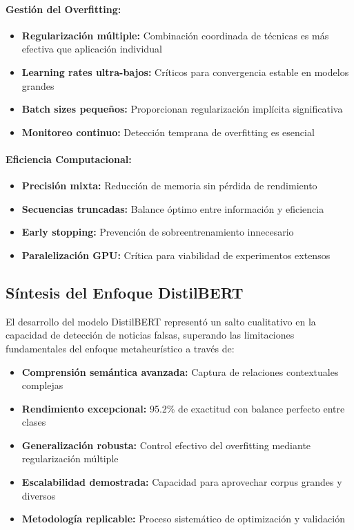 \paragraph{Gestión del Overfitting:}
\begin{itemize}
    \item \textbf{Regularización múltiple:} Combinación coordinada de técnicas es más efectiva que aplicación individual
    \item \textbf{Learning rates ultra-bajos:} Críticos para convergencia estable en modelos grandes
    \item \textbf{Batch sizes pequeños:} Proporcionan regularización implícita significativa
    \item \textbf{Monitoreo continuo:} Detección temprana de overfitting es esencial
\end{itemize}

\paragraph{Eficiencia Computacional:}
\begin{itemize}
    \item \textbf{Precisión mixta:} Reducción de memoria sin pérdida de rendimiento
    \item \textbf{Secuencias truncadas:} Balance óptimo entre información y eficiencia
    \item \textbf{Early stopping:} Prevención de sobreentrenamiento innecesario
    \item \textbf{Paralelización GPU:} Crítica para viabilidad de experimentos extensos
\end{itemize}

\subsection{Síntesis del Enfoque DistilBERT}
\label{subsec:sintesis_distilbert}

El desarrollo del modelo DistilBERT representó un salto cualitativo en la capacidad de detección de noticias falsas, superando las limitaciones fundamentales del enfoque metaheurístico a través de:

\begin{itemize}
    \item \textbf{Comprensión semántica avanzada:} Captura de relaciones contextuales complejas
    \item \textbf{Rendimiento excepcional:} 95.2\% de exactitud con balance perfecto entre clases
    \item \textbf{Generalización robusta:} Control efectivo del overfitting mediante regularización múltiple
    \item \textbf{Escalabilidad demostrada:} Capacidad para aprovechar corpus grandes y diversos
    \item \textbf{Metodología replicable:} Proceso sistemático de optimización y validación
\end{itemize}

